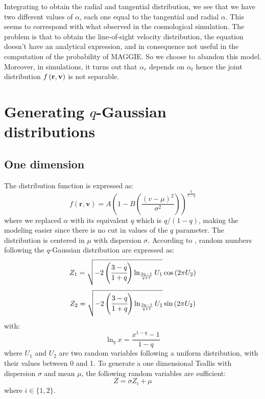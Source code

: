 Integrating to obtain the radial and tangential distribution, we see that we
have two different values of $\alpha$, each one equal to the tangential and
radial $\alpha$. This seems to correspond with what observed in the
cosmological simulation. The problem is that to obtain the line-of-sight
velocity distribution, the equation doesn't have an analytical expression,
and in consequence not useful in the computation of the probability of
MAGGIE\@. So we choose to abandon this model. Moreover, in simulations, it
turns out that $\alpha_r$ depends on $\alpha_t$ hence the joint distribution $f
\left(\bf r, v\right)$ is not separable.

\section{Generating $q$-Gaussian distributions}
\label{sec:generate_q_gaussian_distributions}

\subsection{One dimension}
\label{sub:one_dimension}

The distribution function is expressed as:
%
\begin{equation}
    f\left(\textbf{r},\textbf{v}\right)=
    A{\left(
        1-B\left(\frac{{\left(v-\mu\right)}^2}{\sigma^2}\right)
    \right)}^{\frac{q}{1-q}}
\end{equation}
%
where we replaced $\alpha$ with its equivalent $q$ which is
$q/\left(1-q\right)$, making the modeling easier since there is no cut in
values of the $q$ parameter. The distribution is centered in $\mu$ with
dispersion $\sigma$. According to \citet{Thistleton+06}, random numbers
following the $q$-Gaussian distribution are expressed as:
%
\begin{equation}
    Z_1=\sqrt{-2\left(\cfrac{3-q}{1+q}\right)\ln_{\frac{3q-1}{q+1}}U_1}
    \cos\left(2\pi U_2\right)
\end{equation}
%
\begin{equation}
    Z_2=\sqrt{-2\left(\cfrac{3-q}{1+q}\right)\ln_{\frac{3q-1}{q+1}}U_1}
    \sin\left(2\pi U_2\right)
\end{equation}
%
with:
%
\begin{equation}
    \ln_q x=\frac{x^{1-q}-1}{1-q}
\end{equation}
%
where $U_1$ and $U_2$ are two random variables following a uniform
distribution, with their values between 0 and 1. To generate a one
dimensional Tsallis with dispersion $\sigma$ and mean $\mu$, the following
random variables are sufficient:
%
\begin{equation}
    Z = \sigma Z_i + \mu
\end{equation}
%
where $i\in \{1,2 \}$.

